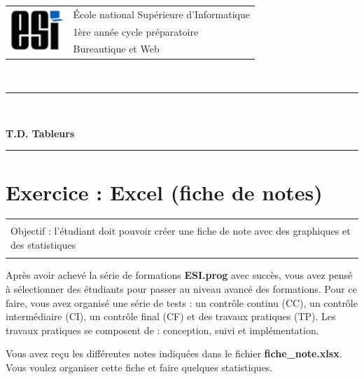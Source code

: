 \documentclass[11pt, a4paper]{article}
\begin{document}

\noindent
\begin{tabular}{ll}
\multirow{3}{*}{\includegraphics[width=2cm]{../esi-logo.png}} & \'Ecole national Supérieure d'Informatique\\
& 1ère année cycle préparatoire\\
& Bureautique et Web
\end{tabular}\\[.25cm]
\noindent\rule{\textwidth}{1pt}\\%
\begin{center}
{\LARGE \textbf{T.D. Tableurs}}
\end{center}
\noindent\rule{\textwidth}{1pt}

\section*{Exercice : Excel (fiche de notes)}

\vspace{-12pt}
\begin{tabular}{|p{\textwidth}|}
	\hline\\
	Objectif : l'étudiant doit pouvoir créer une fiche de note avec des graphiques et des statistiques  \\\\
	\hline
\end{tabular}

Après avoir achevé la série de formations \textbf{ESI.prog} avec succès, vous avez pensé à sélectionner des étudiants pour passer au niveau avancé des formations. 
Pour ce faire, vous avez organisé une série de tests : un contrôle continu (CC), un contrôle intermédiaire (CI), un contrôle final (CF) et des travaux pratiques (TP). 
Les travaux pratiques se composent de : conception, suivi et implémentation. 

Vous avez reçu les différentes notes indiquées dans le fichier \textbf{fiche\_note.xlsx}. 
Vous voulez organiser cette fiche et faire quelques statistiques.
\end{document}
